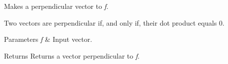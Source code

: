 Makes a perpendicular vector to {\itshape f}. 

Two vectors are perpendicular if, and only if, their dot product equals 0. 
\begin{DoxyParams}{Parameters}
{\em f} & Input vector. \\
\hline
\end{DoxyParams}
\begin{DoxyReturn}{Returns}
Returns a vector perpendicular to {\itshape f}. 
\end{DoxyReturn}
